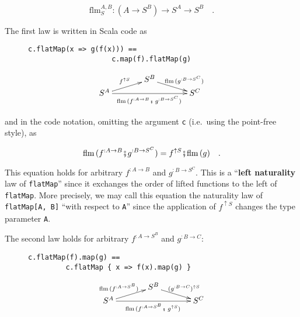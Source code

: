 ~\vspace{-0.5\baselineskip}
\[
\text{flm}_{S}^{A,B}:(A\rightarrow S^{B})\rightarrow S^{A}\rightarrow S^{B}\quad.
\]

The first law is written in Scala code as

\begin{wrapfigure}{l}{0.4\columnwidth}%
\vspace{-0.75\baselineskip}

\begin{lstlisting}
c.flatMap(x => g(f(x))) ==
                    c.map(f).flatMap(g)
\end{lstlisting}
\vspace{0.2\baselineskip}
\[
\xymatrix{\xyScaleY{0.2pc}\xyScaleX{3pc} & S^{B}\ar[rd]\sp(0.5){~~\ \text{flm}\,(g^{:B\rightarrow S^{C}})}\\
S^{A}\ar[ru]\sp(0.5){f^{\uparrow S}}\ar[rr]\sb(0.5){\text{flm}\,(f^{:A\rightarrow B}\bef\,g^{:B\rightarrow S^{C}})\,} &  & S^{C}
}
\]

\vspace{-0.6\baselineskip}
\end{wrapfigure}%

\noindent and in the code notation, omitting the argument \lstinline!c!
(i.e.~using the point-free style), as

\begin{equation}
\text{flm}\,(f^{:A\rightarrow B}\bef g^{:B\rightarrow S^{C}})=f^{\uparrow S}\bef\text{flm}\,(g)\quad.\label{eq:left-naturality-law-flatMap}
\end{equation}

\noindent This equation holds for arbitrary $f^{:A\rightarrow B}$
and $g^{:B\rightarrow S^{C}}$. This is a \textsf{``}\textbf{left naturality}
law of \lstinline!flatMap!\textsf{''}
since it exchanges the order of lifted functions to the left of \lstinline!flatMap!.
More precisely, we may call this equation the naturality law of \lstinline!flatMap[A, B]!
\textsf{``}with respect to \lstinline!A!\textsf{''} since the application of $f^{\uparrow S}$
changes the type parameter \lstinline!A!.

The second law holds for arbitrary $f^{:A\rightarrow S^{B}}$ and
$g^{:B\rightarrow C}$:

\begin{wrapfigure}{l}{0.4\columnwidth}%
\vspace{-0.75\baselineskip}

\begin{lstlisting}
c.flatMap(f).map(g) ==
         c.flatMap { x => f(x).map(g) }
\end{lstlisting}
\vspace{0.2\baselineskip}
\[
\xymatrix{\xyScaleY{0.2pc}\xyScaleX{3pc} & S^{B}\ar[rd]\sp(0.5){\ \,(g^{:B\rightarrow C})^{\uparrow S}}\\
S^{A}\ar[ru]\sp(0.5){\text{flm}\,(f^{:A\rightarrow S^{B}})~~~}\ar[rr]\sb(0.5){\text{flm}\,(f^{:A\rightarrow S^{B}}\bef\,g^{\uparrow S})\,} &  & S^{C}
}
\]

\vspace{-0.9\baselineskip}
\end{wrapfigure}%


